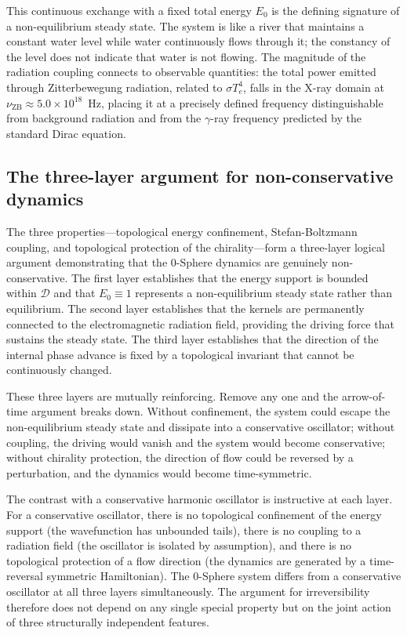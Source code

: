 \documentclass[%
 reprint, amsmath,amssymb, aps, prb, ]{revtex4-2}
\numberwithin{equation}{section}
\begin{document}
This continuous exchange with a fixed total energy $E_0$ is the defining signature of a non-equilibrium steady state. The system is like a river that maintains a constant water level while water continuously flows through it; the constancy of the level does not indicate that water is not flowing. The magnitude of the radiation coupling connects to observable quantities: the total power emitted through Zitterbewegung radiation, related to $\sigma T_e^4$, falls in the X-ray domain at $\nu_{\mathrm{ZB}} \approx 5.0 \times 10^{18}$~Hz, placing it at a precisely defined frequency distinguishable from background radiation and from the $\gamma$-ray frequency predicted by the standard Dirac equation.

\subsection{The three-layer argument for non-conservative dynamics}
\label{sec:three_layer}

The three properties---topological energy confinement, Stefan-Boltzmann coupling, and topological protection of the chirality---form a three-layer logical argument demonstrating that the 0-Sphere dynamics are genuinely non-conservative. The first layer establishes that the energy support is bounded within $\mathcal{D}$ and that $E_0 \equiv 1$ represents a non-equilibrium steady state rather than equilibrium. The second layer establishes that the kernels are permanently connected to the electromagnetic radiation field, providing the driving force that sustains the steady state. The third layer establishes that the direction of the internal phase advance is fixed by a topological invariant that cannot be continuously changed.

These three layers are mutually reinforcing. Remove any one and the arrow-of-time argument breaks down. Without confinement, the system could escape the non-equilibrium steady state and dissipate into a conservative oscillator; without coupling, the driving would vanish and the system would become conservative; without chirality protection, the direction of flow could be reversed by a perturbation, and the dynamics would become time-symmetric.

The contrast with a conservative harmonic oscillator is instructive at each layer. For a conservative oscillator, there is no topological confinement of the energy support (the wavefunction has unbounded tails), there is no coupling to a radiation field (the oscillator is isolated by assumption), and there is no topological protection of a flow direction (the dynamics are generated by a time-reversal symmetric Hamiltonian). The 0-Sphere system differs from a conservative oscillator at all three layers simultaneously. The argument for irreversibility therefore does not depend on any single special property but on the joint action of three structurally independent features.
\end{document}
